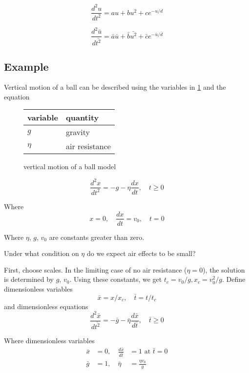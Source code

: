 \documentclass[12pt]{article}
\begin{document}
\begin{equation}
  \label{eq:dim-full-eq}
  \frac{d^2u}{dt^2} = au + bu^2 + ce^{-u/d}
\end{equation}

\begin{equation}
  \label{eq:dim-less-eq}
  \frac{d^2\bar{u}}{d\bar{t^2}} = \bar{a} \bar{u} + \bar{b} \bar{u^2} + \bar{c}e^{-\bar{u}/\bar{d}}
\end{equation}

\subsection{Example}
Vertical motion of a ball can be described using the variables in
\cref{fig:ball-model} and the equation

\begin{figure}
  \centering
  \begin{tabularx}{0.5\textwidth}{XX}
    variable & quantity \\ \hline
    $g$ & gravity \\
    $\eta$ & air resistance \\
  \end{tabularx}
  \caption{vertical motion of a ball model}
  \label{fig:ball-model}
\end{figure}

\begin{equation}
  \frac{d^2x}{dt^2} = -g - \eta\frac{dx}{dt}, \quad t\ge0
\end{equation}

Where
\begin{equation}
  x=0,\quad \frac{dx}{dt} = v_0, \quad t=0
\end{equation}

Where $\eta$, $g$, $v_0$ are constants greater than zero.

Under what condition on $\eta$ do we expect air effects to be small?

First, choose scales. In the limiting case of no air resistance ($\eta=0$), the
solution is determined by $g$, $v_0$. Using these constants, we get
$t_c=v_0/g, x_c=v_0^2/g$. Define dimensionless variables
$$\bar{x}=x/x_c,\quad \bar{t}=t/t_c$$ and dimensionless
equations
\begin{equation}
  \frac{d^2\bar{x}}{d\bar{t^2}} = -\bar{g} -
  \bar{\eta}\frac{d\bar{x}}{d\bar{t}}, \quad \bar{t}\ge0
\end{equation}

Where dimensionless variables
\begin{equation}
  \begin{aligned}
    \bar{x} &= 0,\quad \frac{d\bar{x}}{d\bar{t}}&=1 \text{ at } \bar{t}=0 \\
    \bar{g} &= 1, \quad \bar{\eta} &= \frac{\eta v_0}{g} \\
  \end{aligned}
\end{equation}
\end{document}
